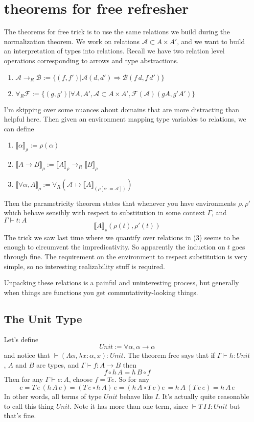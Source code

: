 \documentclass[12pt]{article}
\begin{document}
\section{theorems for free refresher}
The theorems for free trick is to use the same relations we build during the normalization theorem.
We work on relations $\mathcal{A} \subset A \times A'$, and we want to build an interpretation of types into relations.
Recall we have two relation level operations corresponding to arrows and type abstractions.
\begin{enumerate}
    \item $\mathcal{A} \rightarrow_R \mathcal{B} := \{ (f, f') |
     \mathcal{A}(d,d') \Rightarrow \mathcal{B}(f\, d, f\, d')\}$
    \item $\forall_R \mathcal{F} := \{(g,g') | \forall A, A', \mathcal{A} \subset A \times A', 
     \mathcal{F}(\mathcal{A}) (g A , g' A')\}$
\end{enumerate}
I'm skipping over some nuances about domains that are more distracting than helpful here.
Then given an environment mapping type variables to relations, we can define
\begin{enumerate}
    \item $\llbracket \alpha\rrbracket_\rho := \rho(\alpha)$
    \item $\llbracket A \rightarrow B \rrbracket_\rho := \llbracket A\rrbracket_\rho \rightarrow_R \llbracket B \rrbracket_\rho $
    \item $\llbracket \forall \alpha, A\rrbracket_\rho := 
       \forall_R (\mathcal{A} \mapsto \llbracket A \rrbracket_{(\rho[\alpha := \mathcal{A}])})$
\end{enumerate}
Then the parametricity theorem states that whenever you have environments $\rho, \rho'$ which behave sensibly with respect to substitution in some context $\Gamma$, 
and $\Gamma \vdash t : A$
\[
  \llbracket A \rrbracket_\rho (\rho(t), \rho'(t))
\]
The trick we saw last time where we quantify over relations in (3) seems to be enough to circumvent the impredicativity.
So apparently the induction on $t$ goes through fine.
The requirement on the environment to respect substitution is very simple, so no interesting realizability stuff is required.

Unpacking these relations is a painful and uninteresting process, but generally when things are functions you get commutativity-looking things. 
\subsection{The Unit Type}
Let's define
\[
  Unit := \forall \alpha, \alpha \rightarrow \alpha
\]
and notice that $\vdash (\Lambda \alpha, \lambda x : \alpha, x) : Unit$.
The theorem free says that if $\Gamma \vdash h : Unit$, $A$ and $B$ are types, and $\Gamma \vdash f : A \rightarrow B$ then 
\[
  f \circ h\, A = h\, B \circ f
\]
Then for any $\Gamma \vdash e : A$, choose $f = T e$. 
So for any
\[
e = T\, e\, (h\, A\, e) = (T\, e \circ h\, A)\, e = 
    (h\, A \circ T\, e) e\, = h\, A\, (T\, e\, e) = h\, A\, e
\]
In other words, all terms of type $Unit$ behave like $I$.
It's actually quite reasonable to call this thing $Unit$.
Note it has more than one term, since $\vdash T\, I\, I : Unit$ but that's fine.
\end{document}
